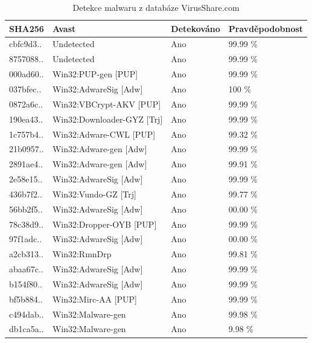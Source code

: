 \begin{table}[H]
    \centering
	\begin{tabular}{|l|l|l|l|}
		\hline
		SHA256    & Avast              			   & Detekováno & Pravděpodobnost \\ \hline
		\hline
		cbfc9d3.. & Undetected                     & Ano  & 99.99 \% \\ \hline
		8757088.. & Undetected                     & Ano  & 99.99 \% \\ \hline
		000ad60.. & Win32:PUP-gen {[}PUP{]}        & Ano  & 99.99 \% \\ \hline
		037bfec.. & Win32:AdwareSig {[}Adw{]}      & Ano  & 100 \% \\ \hline
		0872a6c.. & Win32:VBCrypt-AKV {[}PUP{]}    & Ano  & 99.99 \% \\ \hline
		190ea43.. & Win32:Downloader-GYZ {[}Trj{]} & Ano  & 99.99 \% \\ \hline
		1c757b4.. & Win32:Adware-CWL {[}PUP{]}     & Ano  & 99.32 \% \\ \hline
		21b0957.. & Win32:Adware-gen {[}Adw{]}     & Ano  & 99.99 \% \\ \hline
		2891ae4.. & Win32:Adware-gen {[}Adw{]}     & Ano  & 99.91 \% \\ \hline
		2e58e15.. & Win32:AdwareSig {[}Adw{]}      & Ano  & 99.99 \% \\ \hline
		436b7f2.. & Win32:Vundo-GZ {[}Trj{]}       & Ano  & 99.77 \% \\ \hline
		56bb2f5.. & Win32:AdwareSig {[}Adw{]}      & Ano  & 00.00 \% \\ \hline
		78c38d9.. & Win32:Dropper-OYB {[}PUP{]}    & Ano  & 99.99 \% \\ \hline
		97f1adc.. & Win32:AdwareSig {[}Adw{]}      & Ano  & 00.00 \% \\ \hline
		a2cb313.. & Win32:RmnDrp                   & Ano  & 99.81 \% \\ \hline
		abaa67c.. & Win32:AdwareSig {[}Adw{]}      & Ano  & 99.99 \% \\ \hline
		b154f80.. & Win32:AdwareSig {[}Adw{]}      & Ano  & 99.99 \% \\ \hline
		bf5b884.. & Win32:Mirc-AA {[}PUP{]}        & Ano  & 99.99 \% \\ \hline
		c494dab.. & Win32:Malware-gen              & Ano  & 99.98 \% \\ \hline
		db1ca5a.. & Win32:Malware-gen              & Ano  & 9.98 \%  \\ \hline
	\end{tabular}
    \caption{Detekce malwaru z databáze VirusShare.com}
    \label{table:virusharae_malware}
\end{table}

